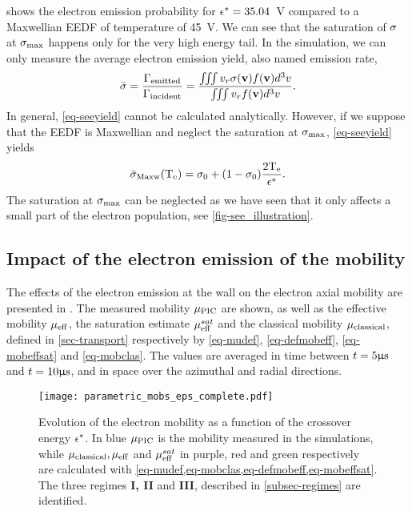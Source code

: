    shows the electron emission probability for $\epsilon^{*}=35.04$~V compared to a Maxwellian \ac{EEDF} of temperature of 45~V.
  We can see that the saturation of $\sigma $ at $\sigma _{\rm max} $ happens only for the very high energy tail.
  In the simulation, we can only measure the average electron emission yield, also named emission rate, 
  \begin{equation} \label{eq-seeyield}
     \bar{\sigma } = \frac{\Gamma_{\rm emitted}}{\Gamma_{\rm incident}} = \frac{\iiint v_r \sigma ({\mathbf v}) f({\mathbf v}) d^3v}{\iiint v_r  f({\mathbf v}) d^3v}.
  \end{equation}
  In general, \cref{eq-seeyield} cannot be calculated analytically.
  However, if we suppose that the \ac{EEDF} is Maxwellian and neglect the saturation at $\sigma _{\rm max} $, \cref{eq-seeyield} yields
  \begin{equation} \label{eq-seemaxw}
     \bar{\sigma }_{\rm Maxw}(\mathrm{T_e}) = \sigma _0 + (1 - \sigma _0) \frac{2 \mathrm{T_e}}{\epsilon^{*}}.
  \end{equation}
  The saturation at $\sigma _{\rm max} $ can be neglected as we have seen that it only affects a small part of the electron population, see \cref{fig-see_illustration}.
  
  \subsection{Impact of the electron emission of the mobility} \label{subsec-param-mob}
    
  The effects of the electron emission at the wall on the electron axial mobility are presented in .
  The measured mobility $\mu_{\mathrm{PIC}}$ are shown, as well as the effective mobility $\mu_{\mathrm{eff}}$, the saturation estimate $\mu_{\mathrm{eff}}^{sat}$ and the classical mobility $\mu_{\mathrm{classical}}$, defined in \cref{sec-transport} respectively by \cref{eq-mudef}, \cref{eq-defmobeff}, \cref{eq-mobeffsat} and \cref{eq-mobclas}.
  The values are averaged in time between $t=5 \mathrm{\upmu s}$ and $t=10\mathrm{\upmu s}$, and in space over the azimuthal and radial directions.
  \begin{figure}[hbtp]
    \centering
    \texttt{[image: parametric\_mobs\_eps\_complete.pdf]}
    \caption{Evolution of the electron mobility as a function of the crossover energy $\epsilon^{*}$. In blue $\mu_{\mathrm{PIC}}$ is the mobility measured in the simulations, while $\mu_{\mathrm{classical}}, \mu_{\mathrm{eff}}$ and $\mu_{\mathrm{eff}}^{sat}$ in purple, red and green respectively are calculated with \cref{eq-mudef,eq-mobclas,eq-defmobeff,eq-mobeffsat}. The three regimes {\bf I, II} and {\bf III}, described in \cref{subsec-regimes} are identified.}
    \label{fig-mob-epsstar}
  \end{figure}
  
